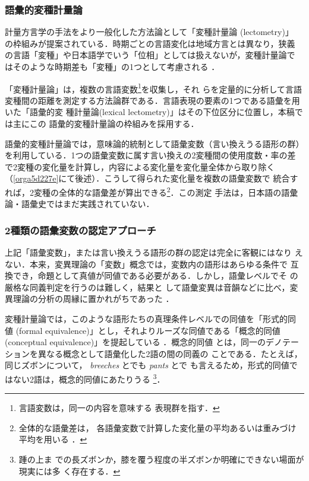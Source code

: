 \documentclass[submit]{ipsj}
\renewcommand{\ref}{\cref}
\begin{document}
\subsubsection{語彙的変種計量論\label{orgb0b0178}}
\label{sec:org10a5d74}
計量方言学の手法をより一般化した方法論として「変種計量論 (lectometry)」
の枠組みが提案されている．時期ごとの言語変化は地域方言とは異なり，狭義
の言語「変種」や日本語学でいう「位相」としては扱えないが，変種計量論で
はそのような時期差も「変種」の1つとして考慮される
\cite{Geeraerts2023Lexical}．

「変種計量論」は，複数の言語変数\footnote{言語変数は，同一の内容を意味する
表現群を指す\cite[, 188]{Labov1972Sociolinguistic}．}を収集し，それ
らを定量的に分析して言語変種間の距離を測定する方法論群である\cite{Ruette2014Semantic}．言語表現の要素の1つである語彙を用いた「語彙的変
種計量論(lexical lectometry)」はその下位区分に位置し，本稿では主にこの
語彙的変種計量論の枠組みを採用する．

語彙的変種計量論では，意味論的統制として語彙変数（言い換えうる語形の群）
を利用している．1つの語彙変数に属す言い換えの2変種間の使用度数・率の差
で2変種の変化量を計算し，内容による変化量を変化量全体から取り除く
（\ref{orga5d227e}にて後述）．こうして得られた変化量を複数の語彙変数で
統合すれば，2変種の全体的な語彙差が算出できる\footnote{全体的な語彙差は，
各語彙変数で計算した変化量の平均あるいは重みづけ平均を用いる
\cite{Ruette2014Semantic,Speelman2003Profilebased}．}．この測定
手法は，日本語の語彙論・語彙史ではまだ実践されていない．
\subsubsection{2種類の語彙変数の認定アプローチ}
\label{sec:orgc4c8bd1}
上記「語彙変数」，または言い換えうる語形の群の認定は完全に客観にはなり
えない．本来，変異理論の「変数」概念では，変数内の語形はあらゆる条件で
互換でき，命題として真値が同値である必要がある．しかし，語彙レベルでそ
の厳格な同義判定を行うのは難しく\cite{Lavandera1978Where}，結果と
して語彙変異は音韻などに比べ，変異理論の分析の周縁に置かれがちであった
\cite{DePascale2019Tokenbased}．

変種計量論では，このような語形たちの真理条件レベルでの同値を「形式的同
値 (formal equivalence)」とし，それよりルーズな同値である「概念的同値
(conceptual equivalence)」を提起している
\cite{Geeraerts2023Lexical,DePascale2019Tokenbased}．概念的同値
とは，同一のデノテーションを異なる概念として語彙化した2語の間の同義の
ことである．たとえば，同じズボンについて， \emph{breeches} とでも \emph{pants} とで
も言えるため，形式的同値ではない2語は，概念的同値にあたりうる
\cite{DePascale2019Tokenbased,Geeraerts2023Lexical}\footnote{踵の上ま
での長ズボンか，膝を覆う程度の半ズボンか明確にできない場面が現実には多
く存在する．}．
\end{document}
